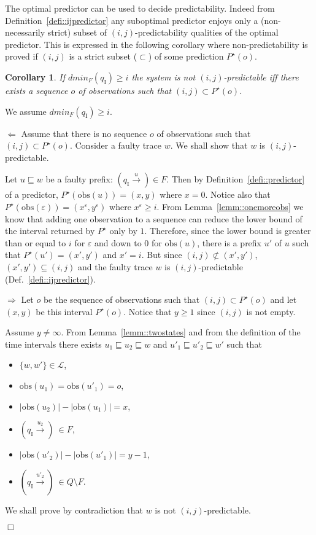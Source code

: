 \documentclass{article}
\newtheorem{coro}[lemm]{Corollary}
\newenvironment{proof}{\par\noindent{\bf Proof}}{\hspace{\stretch{1}}$\Box$}
\newcommand{\prefix}{\sqsubseteq}
\newcommand{\qi}[0]{q_{\mathrm{I}}}
\newcommand{\trans}[1]{\stackrel{#1}{\rightarrow}}
\newcommand{\lang}[0]{\mathcal{L}}
\newcommand{\obs}[0]{\mathrm{obs}}
\newcommand{\dmin}[1]{\mathit{dmin}_{#1}}
\newcommand{\optimal}[1]{{#1}^\star}
\newcommand{\optipred}{\optimal{P}}
\newcommand{\set}[1]{\{#1\}}
\begin{document}
The optimal predictor can be used to decide predictability.  
Indeed from Definition~\ref{defi::ijpredictor} 
any suboptimal predictor enjoys only a (non-necessarily strict) subset 
of $(i,j)$-predictability qualities of the optimal predictor.  
This is expressed in the following corollary 
where non-predictability is proved 
if $(i,j)$ is a strict subset ($\subset$) 
of some prediction $\optipred(o)$.  

\begin{coro}\label{coro::predictfromoptimal}
  If $\dmin{F}(\qi) \ge i$ 
  the system is not $(i,j)$-predictable 
  iff there exists a sequence $o$ of observations 
  such that $(i,j) \subset \optipred(o)$.  
\end{coro}

\begin{proof}
  We assume $\dmin{F}(\qi) \ge i$.  

  $\Leftarrow$
  Assume that there is no sequence $o$ of observations 
  such that $(i,j) \subset \optipred(o)$.  
  Consider a faulty trace $w$.  
  We shall show that $w$ is $(i,j)$-predictable.  

  Let $u \prefix w$ be a faulty prefix: 
  $(\qi \trans{u}) \in F$.  
  Then by Definition~\ref{defi::predictor} of a predictor, 
  $\optipred(\obs(u)) = (x,y)$ where $x = 0$.  
  Notice also that $\optipred(\obs(\varepsilon)) 
  = (x^\varepsilon,y^\varepsilon)$ where $x^\varepsilon \ge i$.  
  From Lemma~\ref{lemm::onemoreobs} 
  we know that adding one observation to a sequence 
  can reduce the lower bound of the interval returned by $\optipred$ 
  only by $1$.  
  Therefore, since the lower bound is greater than or equal to $i$ 
  for $\varepsilon$ and down to $0$ for $\obs(u)$, 
  there is a prefix $u'$ of $u$ 
  such that $\optipred(u') = (x',y')$ and $x' = i$.  
  But since $(i,j) \not\subset (x',y')$, 
  $(x',y') \subseteq (i,j)$ and the faulty trace $w$ 
  is $(i,j)$-predictable (Def.~\ref{defi::ijpredictor}).  


  $\Rightarrow$
  Let $o$ be the sequence of observations 
  such that $(i,j) \subset \optipred(o)$ 
  and let $(x,y)$ be this interval $\optipred(o)$.  
  Notice that $y \ge 1$ since $(i,j)$ is not empty.  

  Assume $y \neq \infty$.  
  From Lemma~\ref{lemm::twostates} 
  and from the definition of the time intervals 
  there exists $u_1 \prefix u_2 \prefix w$ 
  and $u'_1 \prefix u'_2 \prefix w'$ 
  such that 
  \begin{itemize}
  \item 
    $\set{w,w'} \in \lang$, 
  \item 
    $\obs(u_1) = \obs(u'_1) = o$, 
  \item 
    $|\obs(u_2)| - |\obs(u_1)| = x$, 
  \item 
    $(\qi \trans{u_2}) \ \in F$, 
  \item 
    $|\obs(u'_2)| - |\obs(u'_1)| = y-1$, 
  \item 
    $(\qi \trans{u'_2}) \ \in Q \setminus F$.  
  \end{itemize}
  We shall prove by contradiction that $w$ is not $(i,j)$-predictable.  
  

\end{proof}
\end{document}
